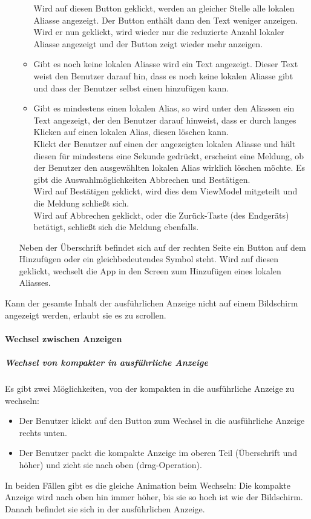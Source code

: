 \begin{itemize}
\begin{itemize}
        Wird auf diesen Button geklickt, werden an gleicher Stelle alle lokalen Aliasse angezeigt. 
        Der Button enthält dann den Text \dq{}weniger anzeigen\dq{}. Wird er nun geklickt, wird wieder nur die 
        reduzierte Anzahl lokaler Aliasse angezeigt und der Button zeigt wieder \dq{}mehr anzeigen\dq{}.
        \item Gibt es noch keine lokalen Aliasse wird ein Text angezeigt. Dieser Text weist den Benutzer 
        darauf hin, dass es noch keine lokalen Aliasse gibt und dass der Benutzer selbst einen hinzufügen kann.
        \item Gibt es mindestens einen lokalen Alias, so wird unter den Aliassen ein Text angezeigt, 
        der den Benutzer darauf hinweist, dass er durch langes Klicken auf einen lokalen Alias, diesen 
        löschen kann.\\
        Klickt der Benutzer auf einen der angezeigten lokalen Aliasse und hält diesen für mindestens eine 
        Sekunde gedrückt, erscheint eine Meldung, ob der Benutzer den ausgewählten lokalen Alias wirklich 
        löschen möchte. Es gibt die Auswahlmöglichkeiten \dq{}Abbrechen\dq{} und \dq{}Bestätigen\dq{}.\\ 
        Wird auf \dq{}Bestätigen\dq{} geklickt, wird dies dem ViewModel mitgeteilt und die Meldung schließt sich.\\
        Wird auf \dq{}Abbrechen\dq{} geklickt, oder die Zurück-Taste (des Endgeräts) betätigt, schließt sich die Meldung ebenfalls.
    \end{itemize}
    Neben der Überschrift befindet sich auf der rechten Seite ein Button auf dem \dq{}Hinzufügen\dq{} oder ein gleichbedeutendes Symbol steht. 
    Wird auf diesen geklickt, wechselt die App in den Screen zum Hinzufügen eines lokalen Aliasses.
\end{itemize}
Kann der gesamte Inhalt der ausführlichen Anzeige nicht auf einem Bildschirm angezeigt werden, erlaubt sie es zu scrollen.

\paragraph*{Wechsel zwischen Anzeigen}
\subparagraph*{Wechsel von kompakter in ausführliche Anzeige}
Es gibt zwei Möglichkeiten, von der kompakten in die ausführliche Anzeige zu wechseln:
\begin{itemize}
    \item Der Benutzer klickt auf den Button zum Wechsel in die ausführliche Anzeige rechts unten.
    \item Der Benutzer packt die kompakte Anzeige im oberen Teil (Überschrift und höher) und zieht sie nach oben (drag-Operation).
\end{itemize}
In beiden Fällen gibt es die gleiche Animation beim Wechseln: Die kompakte Anzeige wird nach oben hin immer 
höher, bis sie so hoch ist wie der Bildschirm. Danach befindet sie sich in der ausführlichen Anzeige.


